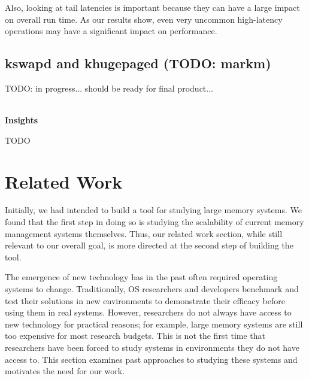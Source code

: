 \documentclass[twocolumn,11pt]{article}
\begin{document}

Also, looking at tail latencies is important because they can
have a large impact on overall run time. As our results show, even very uncommon
high-latency operations may have a significant impact on performance.


\subsection{kswapd and khugepaged (TODO: markm)}

TODO: in progress... should be ready for final product...

~\\ \textbf{Insights} 

TODO



\section{Related Work}

Initially, we had intended to build a tool for studying large memory systems.
We found that the first step in doing so is studying the scalability of current
memory management systems themselves. Thus, our related work section, while
still relevant to our overall goal, is more directed at the second step of
building the tool.

The emergence of new technology has in the past often required operating systems
to change. Traditionally, OS researchers and developers benchmark and test their
solutions in new environments to demonstrate their efficacy before using them in
real systems. However, researchers do not always have access to new technology
for practical reasons; for example, large memory systems are still too expensive
for most research budgets. This is not the first time that researchers have been
forced to study systems in environments they do not have access to. This section
examines past approaches to studying these systems and motivates the need for
our work.
\end{document}
